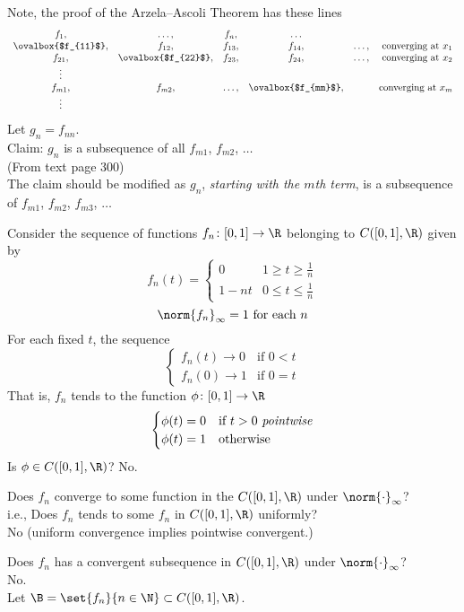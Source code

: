 Note, the proof of the Arzela--Ascoli Theorem has these lines
\[ \begin{array}{cccccr}
f_1, & \dotsc, & f_n, & \dotsc \\
\ovalbox{$f_{11}$}, & f_{12}, & f_{13}, & f_{14}, & \dotsc, & \text{converging at $x_1$} \\
f_{21}, & \ovalbox{$f_{22}$}, & f_{23}, & f_{24}, & \dotsc, & \text{converging at $x_2$} \\
\vdots \\
f_{m1}, & f_{m2}, & \dotsc, & \ovalbox{$f_{mm}$}, & & \text{converging at $x_m$} \\
\vdots
\end{array} \]
Let $g_n=f_{nn}$. \\
Claim: $g_n$ is a subsequence of all $f_{m1}$, $f_{m2}$, $\dotsc$ \\
(From text page 300) \\
The claim should be modified as $g_n$, \emph{starting with the $m$th term}, is a subsequence of $f_{m1}$, $f_{m2}$, $f_{m3}$, $\dotsc$

\eg Consider the sequence of functions $f_n\colon[0,1]\to\R$ belonging to $C([0,1],\R)$ given by
\[ f_n(t) = \begin{cases}
0 & 1 \geq t \geq \tfrac1n \\
1-nt & 0 \leq t \leq \tfrac1n
\end{cases} \]%
\[ \norm{f_n}_\infty=1 \text{ for each $n$} \]
For each fixed $t$, the sequence \[\begin{cases}
f_n(t) \to 0 & \text{if $0<t$} \\
f_n(0) \to 1 & \text{if $0=t$}
\end{cases}\]
That is, $f_n$ tends to the function $\phi\colon[0,1]\to\R$
\[ \begin{cases}
\phi(t) = 0 & \text{if $t>0$ \emph{pointwise}} \\
\phi(t) = 1 & \text{otherwise}
\end{cases} \]
Is $\phi\in C([0,1],\R)$?  No.

Does $f_n$ converge to some function in the $C([0,1],\R)$ under $\norm{\cdot}_\infty$? \\
i.e., Does $f_n$ tends to some $f_n$ in $C([0,1],\R)$ uniformly? \\
No (uniform convergence implies pointwise convergent.)

Does $f_n$ has a convergent subsequence in $C([0,1],\R)$ under $\norm{\cdot}_\infty$? \\
No. \\
Let $\B=\set{f_n}{n\in\N}\subset C([0,1],\R)$.

